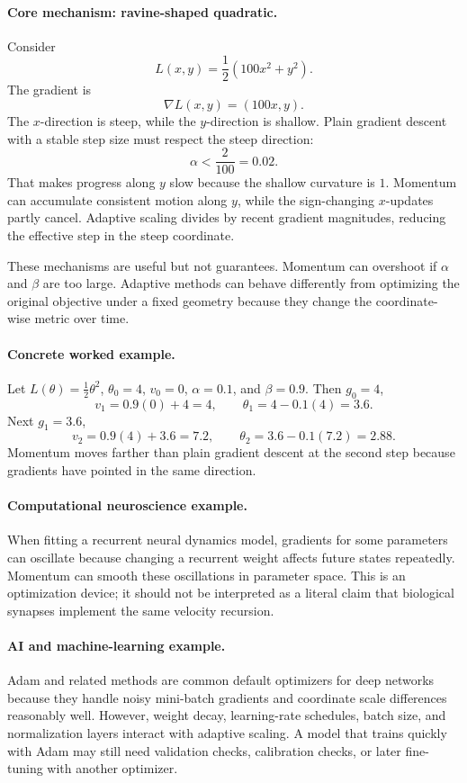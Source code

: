 \paragraph{Core mechanism: ravine-shaped quadratic.}
Consider
\[
L(x,y)=\frac12(100x^2+y^2).
\]
The gradient is
\[
\nabla L(x,y)=(100x,y).
\]
The \(x\)-direction is steep, while the \(y\)-direction is shallow. Plain gradient descent with a stable step size must respect the steep direction:
\[
\alpha<\frac{2}{100}=0.02.
\]
That makes progress along \(y\) slow because the shallow curvature is \(1\). Momentum can accumulate consistent motion along \(y\), while the sign-changing \(x\)-updates partly cancel. Adaptive scaling divides by recent gradient magnitudes, reducing the effective step in the steep coordinate.

These mechanisms are useful but not guarantees. Momentum can overshoot if \(\alpha\) and \(\beta\) are too large. Adaptive methods can behave differently from optimizing the original objective under a fixed geometry because they change the coordinate-wise metric over time.

\paragraph{Concrete worked example.}
Let \(L(\theta)=\frac12\theta^2\), \(\theta_0=4\), \(v_0=0\), \(\alpha=0.1\), and \(\beta=0.9\). Then \(g_0=4\),
\[
v_1=0.9(0)+4=4,\qquad \theta_1=4-0.1(4)=3.6.
\]
Next \(g_1=3.6\),
\[
v_2=0.9(4)+3.6=7.2,\qquad \theta_2=3.6-0.1(7.2)=2.88.
\]
Momentum moves farther than plain gradient descent at the second step because gradients have pointed in the same direction.

\paragraph{Computational neuroscience example.}
When fitting a recurrent neural dynamics model, gradients for some parameters can oscillate because changing a recurrent weight affects future states repeatedly. Momentum can smooth these oscillations in parameter space. This is an optimization device; it should not be interpreted as a literal claim that biological synapses implement the same velocity recursion.

\paragraph{AI and machine-learning example.}
Adam and related methods are common default optimizers for deep networks because they handle noisy mini-batch gradients and coordinate scale differences reasonably well. However, weight decay, learning-rate schedules, batch size, and normalization layers interact with adaptive scaling. A model that trains quickly with Adam may still need validation checks, calibration checks, or later fine-tuning with another optimizer.

